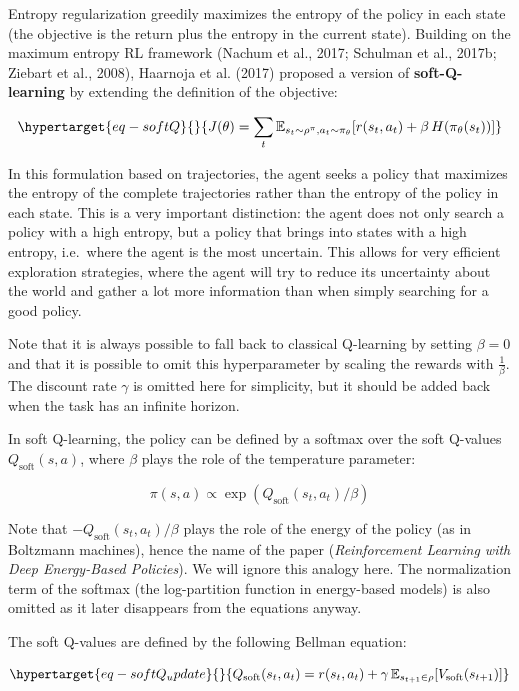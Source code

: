 \documentclass[
  letterpaper,
  DIV=11,
  numbers=noendperiod]{scrreprt}
\begin{document}
Entropy regularization greedily maximizes the entropy of the policy in
each state (the objective is the return plus the entropy in the current
state). Building on the maximum entropy RL framework (Nachum et al.,
2017; Schulman et al., 2017b; Ziebart et al., 2008), Haarnoja et al.
(2017) proposed a version of \textbf{soft-Q-learning} by extending the
definition of the objective:

\begin{equation}\protect\hypertarget{eq-softQ}{}{
    J(\theta) =  \sum_t \mathbb{E}_{s_t \sim \rho^\pi, a_t \sim \pi_\theta}[ r(s_t, a_t) + \beta \,  H(\pi_\theta(s_t))]
}\label{eq-softQ}\end{equation}

In this formulation based on trajectories, the agent seeks a policy that
maximizes the entropy of the complete trajectories rather than the
entropy of the policy in each state. This is a very important
distinction: the agent does not only search a policy with a high
entropy, but a policy that brings into states with a high entropy,
i.e.~where the agent is the most uncertain. This allows for very
efficient exploration strategies, where the agent will try to reduce its
uncertainty about the world and gather a lot more information than when
simply searching for a good policy.

Note that it is always possible to fall back to classical Q-learning by
setting \(\beta=0\) and that it is possible to omit this hyperparameter
by scaling the rewards with \(\frac{1}{\beta}\). The discount rate
\(\gamma\) is omitted here for simplicity, but it should be added back
when the task has an infinite horizon.

In soft Q-learning, the policy can be defined by a softmax over the soft
Q-values \(Q_\text{soft}(s, a)\), where \(\beta\) plays the role of the
temperature parameter:

\[
    \pi(s, a) \propto \exp(Q_\text{soft}(s_t, a_t) / \beta)
\]

Note that \(-Q_\text{soft}(s_t, a_t) / \beta\) plays the role of the
energy of the policy (as in Boltzmann machines), hence the name of the
paper (\emph{Reinforcement Learning with Deep Energy-Based Policies}).
We will ignore this analogy here. The normalization term of the softmax
(the log-partition function in energy-based models) is also omitted as
it later disappears from the equations anyway.

The soft Q-values are defined by the following Bellman equation:

\begin{equation}\protect\hypertarget{eq-softQ_update}{}{
    Q_\text{soft}(s_t, a_t) = r(s_t, a_t) + \gamma \, \mathbb{E}_{s_{t+1} \in \rho} [V_\text{soft}(s_{t+1})]
}\label{eq-softQ_update}\end{equation}
\end{document}
